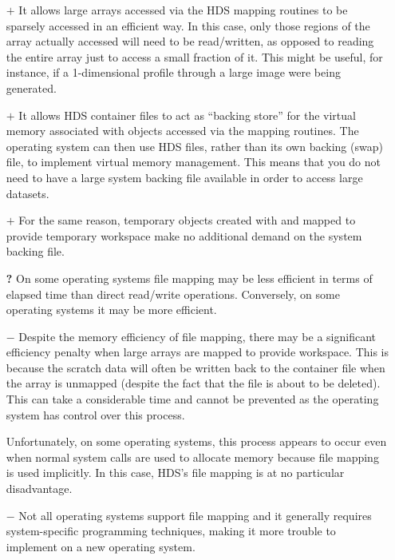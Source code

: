 \documentclass[twoside,11pt]{starlink}
\providecommand{\qt}[1]{``#1''}
\providecommand{\mplus}[0]{{$+$}}
\begin{document}
\begin{description}
\begin{itemize}

\item[\textbf{\mplus}] It allows large arrays accessed via the HDS mapping
routines to be sparsely accessed in an efficient way. In this case,
only those regions of the array actually accessed will need to be
read/written, as opposed to reading the entire array just to access a
small fraction of it. This might be useful, for instance, if a
1-dimensional profile through a large image were being generated.

\item[\textbf{\mplus}] It allows HDS container files to act as \qt{backing store}
for the virtual memory associated with objects accessed via the
mapping routines. The operating system can then use HDS files, rather
than its own backing (swap) file, to implement virtual memory
management. This means that you do not need to have a large system
backing file available in order to access large datasets.

\item[\textbf{\mplus}] For the same reason, temporary objects created with
 and mapped to provide temporary
workspace make no additional demand on the system backing file.

\item[\textbf{?}] On some operating systems file mapping may be less
efficient in terms of elapsed time than direct read/write
operations. Conversely, on some operating systems it may be more
efficient.

\item[\textbf{$-$}] Despite the memory efficiency of file mapping, there may be
a significant efficiency penalty when large arrays are mapped to
provide workspace. This is because the scratch data will often be
written back to the container file when the array is unmapped (despite
the fact that the file is about to be deleted). This can take a
considerable time and cannot be prevented as the operating system has
control over this process.

Unfortunately, on some operating systems, this process appears to
occur even when normal system calls are used to allocate memory
because file mapping is used implicitly. In this case, HDS's file
mapping is at no particular disadvantage.

\item[\textbf{$-$}] Not all operating systems support file mapping and it
generally requires system-specific programming techniques, making it
more trouble to implement on a new operating system.


\end{itemize}
\end{description}
\end{document}
